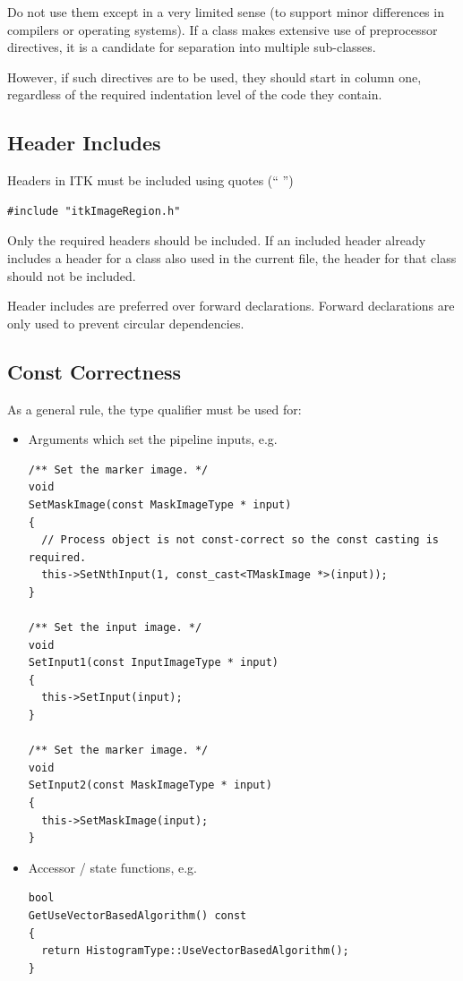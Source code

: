 Do not use them except in a very limited sense (to support minor differences
in compilers or operating systems). If a class makes extensive use of
preprocessor directives, it is a candidate for separation into multiple
sub-classes.

However, if such directives are to be used, they should start in column one,
regardless of the required indentation level of the code they contain.


\subsection{Header Includes}%
\label{subsec:HeaderIncludes}

Headers in ITK must be included using quotes (`` '')

\small
\begin{verbatim}
#include "itkImageRegion.h"
\end{verbatim}
\normalsize

Only the required headers should be included. If an included header already
includes a header for a class also used in the current file, the header for that
class should not be included.

Header includes are preferred over forward declarations. Forward declarations
are only used to prevent circular dependencies.


\subsection{Const Correctness}%
\label{subsec:ConstCorrectness}

As a general rule, the  type qualifier must be used for:
\begin{itemize}
\item Arguments which set the pipeline inputs, e.g.

\small
\begin{verbatim}
/** Set the marker image. */
void
SetMaskImage(const MaskImageType * input)
{
  // Process object is not const-correct so the const casting is required.
  this->SetNthInput(1, const_cast<TMaskImage *>(input));
}

/** Set the input image. */
void
SetInput1(const InputImageType * input)
{
  this->SetInput(input);
}

/** Set the marker image. */
void
SetInput2(const MaskImageType * input)
{
  this->SetMaskImage(input);
}
\end{verbatim}
\normalsize

\item Accessor / state functions, e.g.

\small
\begin{verbatim}
bool
GetUseVectorBasedAlgorithm() const
{
  return HistogramType::UseVectorBasedAlgorithm();
}
\end{verbatim}
\normalsize

\end{itemize}


